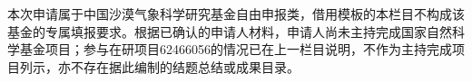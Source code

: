 \justifying
\NSFCBodyText

本次申请属于中国沙漠气象科学研究基金自由申报类，借用模板的本栏目不构成该基金的专属填报要求。根据已确认的申请人材料，申请人尚未主持完成国家自然科学基金项目；参与在研项目62466056的情况已在上一栏目说明，不作为主持完成项目列示，亦不存在据此编制的结题总结或成果目录。
